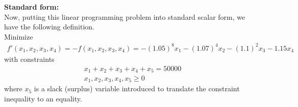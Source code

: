 \documentclass[11pt]{article}
\begin{document}
\begin{sol}
\textbf{Standard form:} \\
Now, putting this linear programming problem into standard scalar form, we have the following definition.  \\

Minimize 
\begin{eqnarray*}
f'(x_{1}, x_{2}, x_{3}, x_{4}) = -f(x_{1}, x_{2}, x_{3}, x_{4}) = -(1.05)^{8}x_{1} -(1.07)^{4}x_{2} -(1.1)^{2}x_{3} -1.15x_{4}
\end{eqnarray*}
with constraints 
\begin{eqnarray*}
x_{1} + x_{2} + x_{3} + x_{4} + x_{5} = 50000 \\
x_{1}, x_{2}, x_{3}, x_{4}, x_{5} \geq 0 
\end{eqnarray*}
where $x_{5}$ is a slack (surplus) variable introduced to translate the constraint inequality to an equality.
\end{sol}
\end{document}
